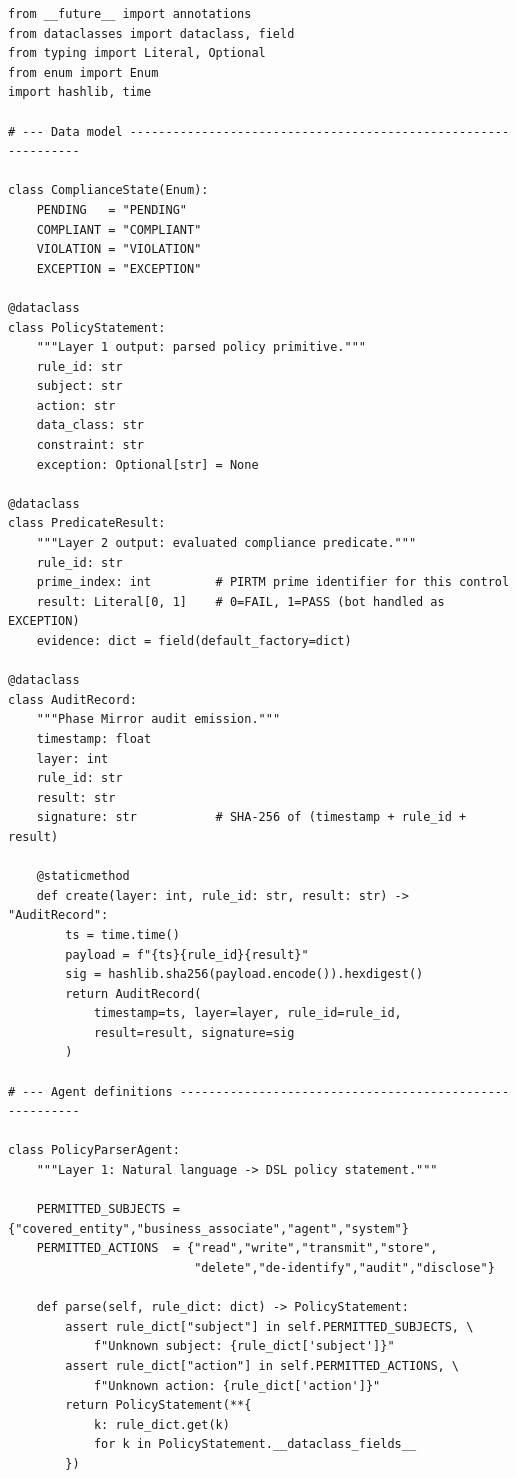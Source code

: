 \documentclass[12pt,letterpaper]{article}
\theoremstyle{definition}
\theoremstyle{plain}
\theoremstyle{remark}
\begin{document}
\begin{lstlisting}[style=pythonStyle,
  caption={PIRTM Policy Pack agent pipeline skeleton (Python 3.12+)}]
from __future__ import annotations
from dataclasses import dataclass, field
from typing import Literal, Optional
from enum import Enum
import hashlib, time

# --- Data model ---------------------------------------------------------------

class ComplianceState(Enum):
    PENDING   = "PENDING"
    COMPLIANT = "COMPLIANT"
    VIOLATION = "VIOLATION"
    EXCEPTION = "EXCEPTION"

@dataclass
class PolicyStatement:
    """Layer 1 output: parsed policy primitive."""
    rule_id: str
    subject: str
    action: str
    data_class: str
    constraint: str
    exception: Optional[str] = None

@dataclass
class PredicateResult:
    """Layer 2 output: evaluated compliance predicate."""
    rule_id: str
    prime_index: int         # PIRTM prime identifier for this control
    result: Literal[0, 1]    # 0=FAIL, 1=PASS (bot handled as EXCEPTION)
    evidence: dict = field(default_factory=dict)

@dataclass
class AuditRecord:
    """Phase Mirror audit emission."""
    timestamp: float
    layer: int
    rule_id: str
    result: str
    signature: str           # SHA-256 of (timestamp + rule_id + result)

    @staticmethod
    def create(layer: int, rule_id: str, result: str) -> "AuditRecord":
        ts = time.time()
        payload = f"{ts}{rule_id}{result}"
        sig = hashlib.sha256(payload.encode()).hexdigest()
        return AuditRecord(
            timestamp=ts, layer=layer, rule_id=rule_id,
            result=result, signature=sig
        )

# --- Agent definitions --------------------------------------------------------

class PolicyParserAgent:
    """Layer 1: Natural language -> DSL policy statement."""

    PERMITTED_SUBJECTS = {"covered_entity","business_associate","agent","system"}
    PERMITTED_ACTIONS  = {"read","write","transmit","store",
                          "delete","de-identify","audit","disclose"}

    def parse(self, rule_dict: dict) -> PolicyStatement:
        assert rule_dict["subject"] in self.PERMITTED_SUBJECTS, \
            f"Unknown subject: {rule_dict['subject']}"
        assert rule_dict["action"] in self.PERMITTED_ACTIONS, \
            f"Unknown action: {rule_dict['action']}"
        return PolicyStatement(**{
            k: rule_dict.get(k)
            for k in PolicyStatement.__dataclass_fields__
        })



\end{lstlisting}
\end{document}
